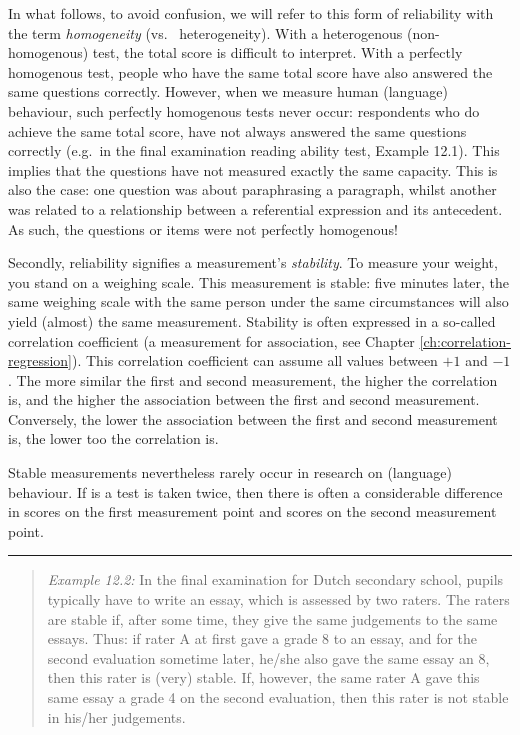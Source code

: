 \documentclass[
]{book}
\begin{document}
In what follows, to avoid confusion, we will refer to this form
of reliability with the term \emph{homogeneity} (vs.~
heterogeneity). With a heterogenous (non-homogenous) test, the total score
is difficult to interpret. With a perfectly homogenous test, people
who have the same total score have also answered the same questions correctly.
However, when we measure human (language) behaviour, such perfectly homogenous tests
never occur: respondents who do achieve the same total score, have not
always answered the same questions correctly (e.g.~in the final examination
reading ability test, Example 12.1). This implies that the questions have not
measured exactly the same capacity. This is also the case: one question was about
paraphrasing a paragraph, whilst another was related to a relationship between
a referential expression and its antecedent.\\
As such, the questions or items were not perfectly homogenous!

Secondly, reliability signifies a measurement's \emph{stability}.
To measure your weight, you stand on a weighing scale. This
measurement is stable: five minutes later, the same weighing scale with the same
person under the same circumstances will also yield (almost)
the same measurement. Stability is often expressed in a so-called
correlation coefficient (a measurement for association, see Chapter
\ref{ch:correlation-regression}). This correlation coefficient can assume all
values between \(+1\) and \(-1\). The more similar the first and second measurement,
the higher the correlation is, and the higher the association between the first and second
measurement. Conversely, the lower the association between the first and second
measurement is, the lower too the correlation is.

Stable measurements nevertheless rarely occur in research on
(language) behaviour. If is a test is taken twice, then there is often
a considerable difference in scores on the first measurement point
and scores on the second measurement point.

\begin{center}\rule{0.5\linewidth}{0.5pt}\end{center}

\begin{quote}
\emph{Example 12.2:}
In the final examination for Dutch secondary school, pupils typically have to write an essay, which is
assessed by two raters. The raters are stable if, after some time, they
give the same judgements to the same essays. Thus: if rater A at first gave a grade
8 to an essay, and for the second evaluation sometime later, he/she also gave the same
essay an 8, then this rater is (very) stable. If, however, the same
rater A gave this same essay a grade 4 on the second evaluation, then this
rater is not stable in his/her judgements.
\end{quote}
\end{document}
